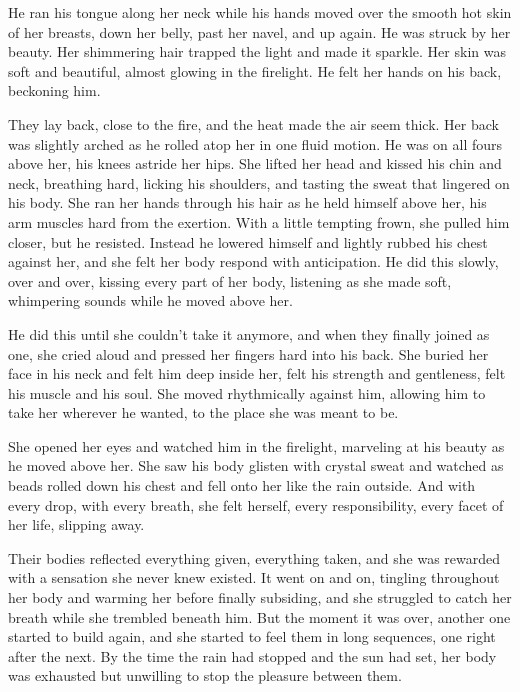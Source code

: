 \documentclass[10pt, twoside, openright]{book}
\begin{document}
He ran his tongue along her neck while his hands moved over the smooth
hot skin of her breasts, down her belly, past her navel, and up again.
He was struck by her beauty. Her shimmering hair trapped the light and
made it sparkle. Her skin was soft and beautiful, almost glowing in the
firelight. He felt her hands on his back, beckoning him.

They lay back, close to the fire, and the heat made the air seem thick.
Her back was slightly arched as he rolled atop her in one fluid motion.
He was on all fours above her, his knees astride her hips. She lifted
her head and kissed his chin and neck, breathing hard, licking his
shoulders, and tasting the sweat that lingered on his body. She ran her
hands through his hair as he held himself above her, his arm muscles
hard from the exertion. With a little tempting frown, she pulled him
closer, but he resisted. Instead he lowered himself and lightly rubbed
his chest against her, and she felt her body respond with anticipation.
He did this slowly, over and over, kissing every part of her body,
listening as she made soft, whimpering sounds while he moved above her.

He did this until she couldn't take it anymore, and when they finally
joined as one, she cried aloud and pressed her fingers hard into his
back. She buried her face in his neck and felt him deep inside her, felt
his strength and gentleness, felt his muscle and his soul. She moved
rhythmically against him, allowing him to take her wherever he wanted,
to the place she was meant to be.

She opened her eyes and watched him in the firelight, marveling at his
beauty as he moved above her. She saw his body glisten with crystal
sweat and watched as beads rolled down his chest and fell onto her like
the rain outside. And with every drop, with every breath, she felt
herself, every responsibility, every facet of her life, slipping away.

Their bodies reflected everything given, everything taken, and she was
rewarded with a sensation she never knew existed. It went on and on,
tingling throughout her body and warming her before finally subsiding,
and she struggled to catch her breath while she trembled beneath him.
But the moment it was over, another one started to build again, and she
started to feel them in long sequences, one right after the next. By the
time the rain had stopped and the sun had set, her body was exhausted
but unwilling to stop the pleasure between them.
\end{document}

